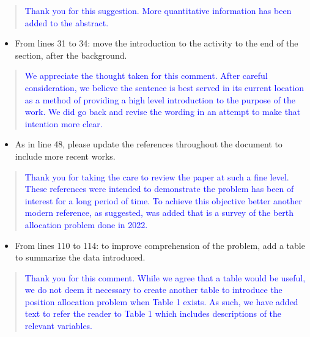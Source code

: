 \documentclass[11pt,a4paper,final]{article}
\begin{document}
\begin{quote}
  \textcolor{blue}{Thank you for this suggestion. More quantitative information has been added to the abstract.}
\end{quote}

\begin{itemize}
\item From lines 31 to 34: move the introduction to the activity to the end of the section, after the background.
\end{itemize}

\begin{quote}
  \textcolor{blue}{We appreciate the thought taken for this comment. After careful consideration, we believe the sentence is best served in its current location as a method of providing a high level introduction to the purpose of the work. We did go back and revise the wording in an attempt to make that intention more clear.}
\end{quote}

\begin{itemize}
\item As in line 48, please update the references throughout the document to include more recent works.
\end{itemize}

\begin{quote}
  \textcolor{blue}{Thank you for taking the care to review the paper at such a fine level. These references were intended to demonstrate the problem has been of interest for a long period of time. To achieve this objective better another modern reference, as suggested, was added that is a survey of the berth allocation problem done in 2022.}
\end{quote}

\begin{itemize}
\item From lines 110 to 114: to improve comprehension of the problem, add a table to summarize the data introduced.
\end{itemize}

\begin{quote}
  \textcolor{blue}{Thank you for this comment. While we agree that a table would be useful, we do not deem it necessary to create another table to introduce the position allocation problem when Table 1 exists. As such, we have added text to refer the reader to Table 1 which includes descriptions of the relevant variables.}
\end{quote}
\end{document}
